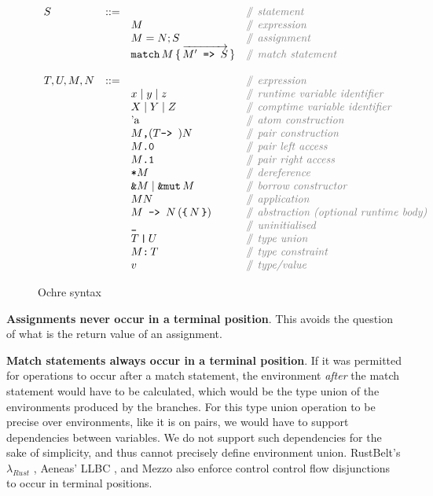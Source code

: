 \documentclass[12pt,twoside]{report}
\begin{document}
\begin{figure}[H]
  \arraycolsep=1pt %
  \centering

  \vspace{-2ex} %
  \[
  \begin{array}[t]{llll}
    S & ::= & & \ocomment{statement} \\
    & & M & \ocomment{expression} \\
    & & M = N; S & \ocomment{assignment} \\
    & & \mono{match}\,M\,\{\,\overrightarrow{M'\mono{ => }S}\,\} & \ocomment{match statement} \\
    \\
    T, U, M, N & ::= & & \ocomment{expression} \\
    && x \mid{} y \mid{} z  & \ocomment{runtime variable identifier} \\
    && X \mid{} Y \mid{} Z  & \ocomment{comptime variable identifier} \\
    && \atom{a} & \ocomment{atom construction} \\
    && M\mono{,} (T \mono{-> }) N & \ocomment{pair construction} \\
    && \pleft{M} & \ocomment{pair left access} \\
    && \pright{M} & \ocomment{pair right access} \\
    && \deref{M} & \ocomment{dereference} \\
    && \mono{\&}M \mid \mono{\&mut}\,M & \ocomment{borrow constructor} \\
    && M N & \ocomment{application} \\
    && \mono{$M$ -> $N$} \,(\mono{\{}\,N\,\mono{\}}) & \ocomment{abstraction (optional runtime body)} \\
    && \mono{\_} & \ocomment{uninitialised} \\
    && T\,\mono{|}\,U & \ocomment{type union} \\
    && M\mono{:}\,T & \ocomment{type constraint} \\
    && v & \ocomment{type/value} \\
  \end{array} %
  \]
\caption{Ochre syntax} %
\label{fig:syntax} %
\end{figure} %

\textbf{Assignments never occur in a terminal position}. This avoids the question of what is the return value of an assignment.

\textbf{Match statements always occur in a terminal position}. If it was permitted for operations to occur after a match statement, the environment \textit{after} the match statement would have to be calculated, which would be the type union of the environments produced by the branches. For this type union operation to be precise over environments, like it is on pairs, we would have to support dependencies between variables. We do not support such dependencies for the sake of simplicity, and thus cannot precisely define environment union. RustBelt's $\lambda_{Rust}$ \citep{jungRustBeltSecuringFoundations2018a}, Aeneas' LLBC \cite[Section 4.3]{aeneas}, and Mezzo \cite{protzenkoMezzoTypedLanguage2014} also enforce control control flow disjunctions to occur in terminal positions.
\end{document}
